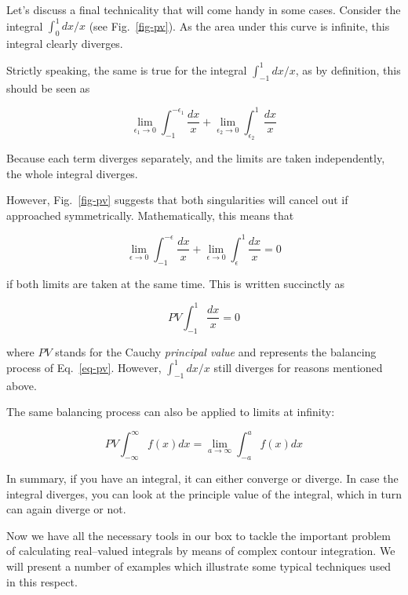 Let's discuss a final technicality that will come handy in some cases. Consider the integral $\int_0^1 dx / x$ (see Fig.~\ref{fig-pv}). As the area under this curve is infinite, this integral clearly diverges.

Strictly speaking, the same is true for the integral $\int_{-1}^1 dx / x$, as by definition, this should be seen as

\begin{equation}
\lim_{\epsilon_1 \to 0} \int_{-1}^{-\epsilon_1} \frac{dx}{x} + \lim_{\epsilon_2
\to 0} \int_{\epsilon_2}^1 \frac{dx}{x}
\end{equation}  

Because each term diverges separately, and the limits are taken independently, the whole integral diverges. 

However, Fig.~\ref{fig-pv} suggests that both singularities will cancel out if approached symmetrically. Mathematically, this means that

\begin{equation}
\lim_{\epsilon \to 0} \int_{-1}^{-\epsilon} \frac{dx}{x} + \lim_{\epsilon \to 0}
\int_{\epsilon}^1 \frac{dx}{x} = 0 \label{eq-pv}
\end{equation}  

if both limits are taken at the same time. This is written succinctly as

\begin{equation}
PV \int_{-1}^1 \frac{dx}{x} = 0
\end{equation} 

where $PV$ stands for the Cauchy \emph{principal value} and represents the balancing process of Eq.~\ref{eq-pv}. However, $\int_{-1}^1 dx / x$ still diverges for reasons mentioned above.

The same balancing process can also be applied to limits at infinity:

\begin{equation}
PV \int_{-\infty}^\infty f(x) dx = \lim_{a \to \infty} \int_{-a}^{a} f(x) dx
\end{equation} 

In summary, if you have an integral, it can either converge or diverge. In case the integral diverges, you can look at the principle value of the integral, which in turn can again diverge or not.

\pagebreak


Now we have all the necessary tools in our box to tackle the important problem
of calculating real--valued integrals by means of complex contour integration.
We will present a number of examples which illustrate some typical techniques
used in this respect.


